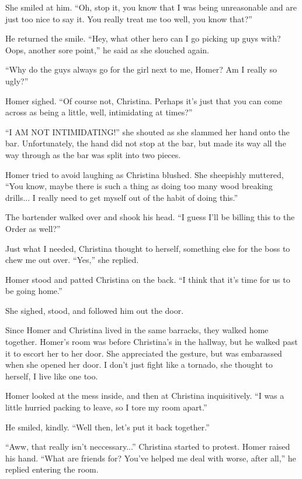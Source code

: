\documentclass[showtrims,b6paper,draft,10pt]{memoir}
\begin{document}
She smiled at him.  ``Oh, stop it, you know that I was being unreasonable and are just too nice to say it.  You really treat me too well, you know that?''

He returned the smile.  ``Hey, what other hero can I go picking up guys with?  Oops, another sore point,'' he said as she slouched again.

``Why do the guys always go for the girl next to me, Homer?  Am I really so ugly?''

Homer sighed.  ``Of course not, Christina.  Perhaps it's just that you can come across as being a little, well, intimidating at times?''

``I AM NOT INTIMIDATING!''  she shouted as she slammed her hand onto the bar.  Unfortunately, the hand did not stop at the bar, but made its way all the way through as the bar was split into two pieces.

Homer tried to avoid laughing as Christina blushed.  She sheepishly muttered, ``You know, maybe there is such a thing as doing too many wood breaking drills...  I really need to get myself out of the habit of doing this.''

The bartender walked over and shook his head.  ``I guess I'll be billing this to the Order as well?''

Just what I needed, Christina thought to herself, something else for the boss to chew me out over.  ``Yes,'' she replied.

Homer stood and patted Christina on the back.  ``I think that it's time for us to be going home.''

She sighed, stood, and followed him out the door. 

\timeskip
Since Homer and Christina lived in the same barracks, they walked home together.  Homer's room was before Christina's in the hallway, but he walked past it to escort her to her door.  She appreciated the gesture, but was embarassed when she opened her door.  I don't just fight like a tornado, she thought to herself, I live like one too.

Homer looked at the mess inside, and then at Christina inquisitively.  ``I was a little hurried packing to leave, so I tore my room apart.''

He smiled, kindly. ``Well then, let's put it back together.''

``Aww, that really isn't neccessary...'' Christina started to protest.  Homer raised his hand.  ``What are friends for?  You've helped me deal with worse, after all,'' he replied entering the room.
\end{document}
